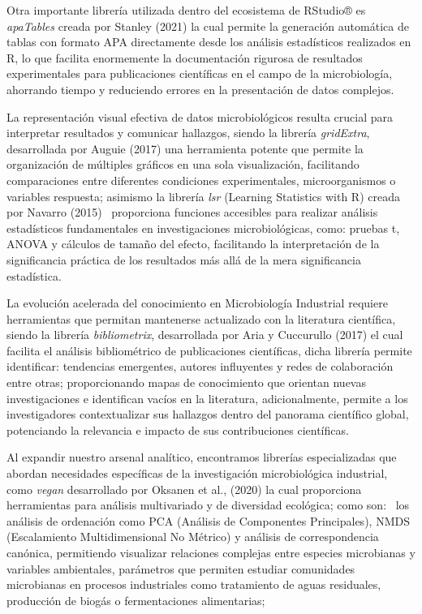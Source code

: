 \documentclass[
  letterpaper,
  DIV=11,
  numbers=noendperiod]{scrreprt}
\begin{document}
Otra importante librería utilizada dentro del ecosistema de RStudio® es
\emph{apaTables} creada por Stanley (2021) la cual permite la generación
automática de tablas con formato APA directamente desde los análisis
estadísticos realizados en R, lo que facilita enormemente la
documentación rigurosa de resultados experimentales para publicaciones
científicas en el campo de la microbiología, ahorrando tiempo y
reduciendo errores en la presentación de datos complejos.

La representación visual efectiva de datos microbiológicos resulta
crucial para interpretar resultados y comunicar hallazgos, siendo la
librería \emph{gridExtra}, desarrollada por Auguie (2017) una
herramienta potente que permite la organización de múltiples gráficos en
una sola visualización, facilitando comparaciones entre diferentes
condiciones experimentales, microorganismos o variables respuesta;
asimismo la librería \emph{lsr} (Learning Statistics with R) creada por
Navarro (2015) ~proporciona funciones accesibles para realizar análisis
estadísticos fundamentales en investigaciones microbiológicas, como:
pruebas t, ANOVA y cálculos de tamaño del efecto, facilitando la
interpretación de la significancia práctica de los resultados más allá
de la mera significancia estadística.

La evolución acelerada del conocimiento en Microbiología Industrial
requiere herramientas que permitan mantenerse actualizado con la
literatura científica, siendo la librería \emph{bibliometrix},
desarrollada por Aria y Cuccurullo (2017) el cual facilita el análisis
bibliométrico de publicaciones científicas, dicha librería permite
identificar: tendencias emergentes, autores influyentes y redes de
colaboración entre otras; proporcionando mapas de conocimiento que
orientan nuevas investigaciones e identifican vacíos en la literatura,
adicionalmente, permite a los investigadores contextualizar sus
hallazgos dentro del panorama científico global, potenciando la
relevancia e impacto de sus contribuciones científicas.

Al expandir nuestro arsenal analítico, encontramos librerías
especializadas que abordan necesidades específicas de la investigación
microbiológica industrial, como \emph{vegan} desarrollado por Oksanen et
al., (2020) la cual proporciona herramientas para análisis multivariado
y de diversidad ecológica; como son:~ los análisis de ordenación como
PCA (Análisis de Componentes Principales), NMDS (Escalamiento
Multidimensional No Métrico) y análisis de correspondencia canónica,
permitiendo visualizar relaciones complejas entre especies microbianas y
variables ambientales, parámetros que permiten estudiar comunidades
microbianas en procesos industriales como tratamiento de aguas
residuales, producción de biogás o fermentaciones alimentarias;
\end{document}
